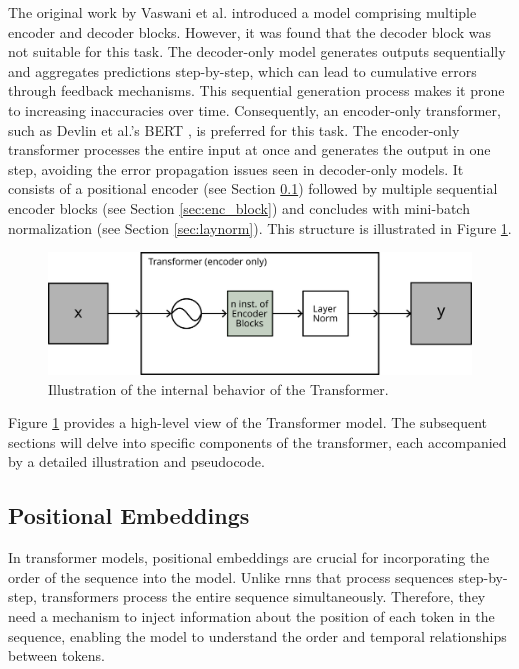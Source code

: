 The original work by Vaswani et al. \cite{transformer} introduced a model comprising multiple encoder and decoder blocks. However, it was found that the decoder block was not suitable for this task. The decoder-only model generates outputs sequentially and aggregates predictions step-by-step, which can lead to cumulative errors through feedback mechanisms. This sequential generation process makes it prone to increasing inaccuracies over time. Consequently, an encoder-only transformer, such as Devlin et al.'s BERT \cite{bert}, is preferred for this task. The encoder-only transformer processes the entire input at once and generates the output in one step, avoiding the error propagation issues seen in decoder-only models. It consists of a positional encoder (see Section \ref{sec:posenc}) followed by multiple sequential encoder blocks (see Section \ref{sec:enc_block}) and concludes with mini-batch normalization (see Section \ref{sec:laynorm}). This structure is illustrated in Figure \ref{fig:transformer}.

\begin{figure}[t]
    \centering
    \includegraphics[width=\textwidth]{contents/Basics/transformer.png}
    \caption{Illustration of the internal behavior of the Transformer.}
    \label{fig:transformer}
\end{figure}

Figure \ref{fig:transformer} provides a high-level view of the Transformer model. The subsequent sections will delve into specific components of the transformer, each accompanied by a detailed illustration and pseudocode.

\subsection{Positional Embeddings}
\label{sec:posenc}
In transformer models, positional embeddings are crucial for incorporating the order of the sequence into the model. Unlike \glspl{rnn} that process sequences step-by-step, transformers process the entire sequence simultaneously. Therefore, they need a mechanism to inject information about the position of each token in the sequence, enabling the model to understand the order and temporal relationships between tokens.

